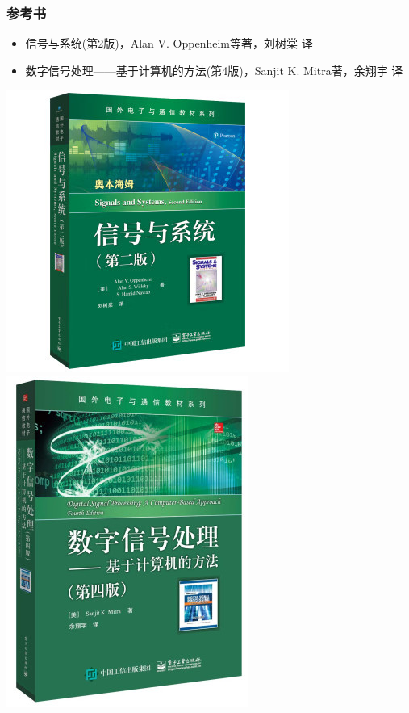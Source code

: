\documentclass[CJKutf8,xcolor=pdftex,dvipsnames,table]{beamer}
\begin{document}
\begin{CJK*}{UTF8}{song}
  \begin{frame}
    \frametitle{参考书}
    \begin{itemize}
    \item 信号与系统(第2版)，Alan V. Oppenheim等著，刘树棠 译
    \item 数字信号处理——基于计算机的方法(第4版)，Sanjit K. Mitra著，余翔宇 译
    \end{itemize}
    \begin{center}
      \includegraphics[scale=.31]{signalsandsystems}
      \hspace{1mm}
      \includegraphics[scale=.35]{mitradsp}
    \end{center}
  \end{frame}
  

\end{CJK*}
\end{document}

